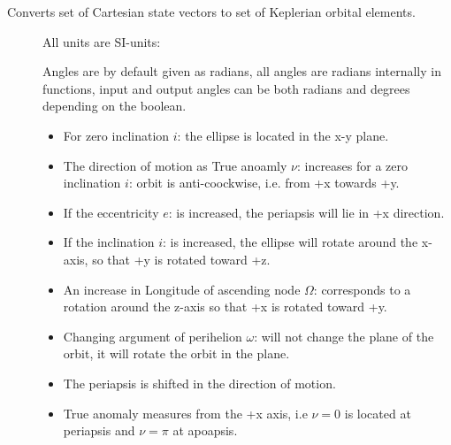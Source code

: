 \documentclass[letterpaper,10pt,english]{sphinxmanual}
\begin{document}

\begin{fulllineitems}
\label{\detokenize{modules/dpt_tools:dpt_tools.cart2kep}}
Converts set of Cartesian state vectors to set of Keplerian orbital elements.
\begin{description}
\item[{}] \leavevmode
All units are SI-units: 

Angles are by default given as radians, all angles are radians internally in functions, input and output angles can be both radians and degrees depending on the  boolean.

\item[{}] \leavevmode\begin{itemize}
\item {} 
For zero inclination \(i\): the ellipse is located in the x-y plane.

\item {} 
The direction of motion as True anoamly \(\nu\): increases for a zero inclination \(i\): orbit is anti-coockwise, i.e. from +x towards +y.

\item {} 
If the eccentricity \(e\): is increased, the periapsis will lie in +x direction.

\item {} 
If the inclination \(i\): is increased, the ellipse will rotate around the x-axis, so that +y is rotated toward +z.

\item {} 
An increase in Longitude of ascending node \(\Omega\): corresponds to a rotation around the z-axis so that +x is rotated toward +y.

\item {} 
Changing argument of perihelion \(\omega\): will not change the plane of the orbit, it will rotate the orbit in the plane.

\item {} 
The periapsis is shifted in the direction of motion.

\item {} 
True anomaly measures from the +x axis, i.e \(\nu = 0\) is located at periapsis and \(\nu = \pi\) at apoapsis.


\end{itemize}
\end{description}
\end{fulllineitems}
\end{document}

